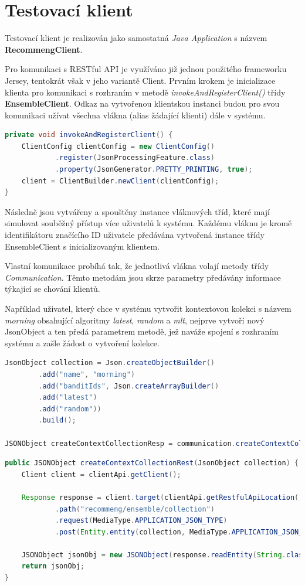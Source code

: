 \documentclass[thesis=M,czech]{FITthesis}[2014/05/07]
\begin{document}
\section{Testovací klient}
\label{chap:client}
Testovací klient je realizován jako samostatná \emph{Java Application} s názvem \textbf{RecommengClient}.

Pro komunikaci s RESTful API je využíváno již jednou použitého frameworku Jersey, tentokrát však v jeho variantě Client. Prvním krokem je inicializace klienta pro komunikaci s rozhraním v metodě \emph{invokeAndRegisterClient()} třídy \textbf{EnsembleClient}. Odkaz na vytvořenou klientskou instanci budou pro svou komunikaci užívat všechna vlákna (alias žádající klienti) dále v systému.

\begin{lstlisting}[language=java]
private void invokeAndRegisterClient() {
    ClientConfig clientConfig = new ClientConfig()
            .register(JsonProcessingFeature.class)
            .property(JsonGenerator.PRETTY_PRINTING, true);
    client = ClientBuilder.newClient(clientConfig);        
}   
\end{lstlisting}

Následně jsou vytvářeny a spouštěny instance vláknových tříd, které mají simulovat souběžný přístup více uživatelů k systému. Každému vláknu je kromě identifikátoru značícího ID uživatele předávána vytvořená instance třídy EnsembleClient s inicializovaným klientem.

Vlastní komunikace probíhá tak, že jednotlivá vlákna volají metody třídy \emph{Communication}. Těmto metodám jsou skrze parametry předávány informace týkající se chování klientů.

Například uživatel, který chce v systému vytvořit kontextovou kolekci s názvem \emph{morning} obsahující algoritmy \emph{latest}, \emph{random} a \emph{mlt}, nejprve vytvoří nový JsonObject a ten předá parametrem metodě, jež naváže spojení s rozhraním systému a zašle žádost o vytvoření kolekce.

\begin{lstlisting}[language=java]
JsonObject collection = Json.createObjectBuilder()
        .add("name", "morning")
        .add("banditIds", Json.createArrayBuilder()
        .add("latest")
        .add("random"))
        .build();

JSONObject createContextCollectionResp = communication.createContextCollectionRest(collection);
\end{lstlisting}

\begin{lstlisting}[language=java]
public JSONObject createContextCollectionRest(JsonObject collection) {
    Client client = clientApi.getClient();

    Response response = client.target(clientApi.getRestfulApiLocation())
            .path("recommeng/ensemble/collection")
            .request(MediaType.APPLICATION_JSON_TYPE)
            .post(Entity.entity(collection, MediaType.APPLICATION_JSON_TYPE));

    JSONObject jsonObj = new JSONObject(response.readEntity(String.class));
    return jsonObj;
}
\end{lstlisting}
\end{document}
